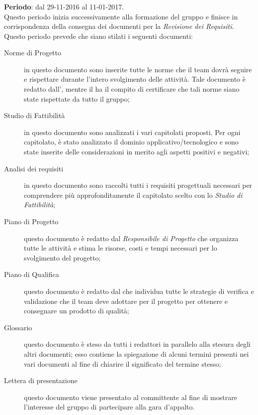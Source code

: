 	\subsubsection{\AR} \label{sec:AR}
	\textbf{Periodo}: dal 29-11-2016 al 11-01-2017.
	\\ Questo periodo inizia successivamente alla formazione del gruppo e finisce in corrispondenza della consegna dei documenti per la \emph{Revisione dei Requisiti}.
	Questo periodo prevede che siano stilati i seguenti documenti:
	\begin{description}
		\item[Norme di Progetto] in questo documento sono inserite tutte le norme che il team dovrà seguire e rispettare durante l'intero svolgimento delle attività. Tale documento è redatto dall'\AMx{}, mentre il \Vx{} ha il compito di certificare che tali norme siano state rispettate da tutto il gruppo;
		\item[Studio di Fattibilità] in questo documento sono analizzati i vari capitolati proposti. Per ogni capitolato, è stato analizzato il dominio applicativo/tecnologico e sono state inserite delle considerazioni in merito agli aspetti positivi e negativi;
		\item[Analisi dei requisiti] in questo documento sono raccolti tutti i requisiti progettuali necessari per comprendere più approfonditamente	il capitolato scelto con lo \emph{Studio di Fattibilità};
		\item[Piano di Progetto] questo documento è redatto dal \emph{Responsibile di Progetto} che organizza tutte le attività e stima le risorse, costi e tempi necessari per lo svolgimento del progetto;
		\item[Piano di Qualifica] questo documento è redatto dal \Vx{} che individua tutte le strategie di verifica e validazione che il team deve adottare per il progetto per ottenere e consegnare un prodotto di qualità;
		\item[Glossario] questo documento è steso da tutti i redattori in parallelo alla stesura degli altri documenti; esso contiene la spiegazione di alcuni termini presenti nei vari documenti al fine di chiarire il significato del termine stesso;
		\item[Lettera di presentazione] questo documento viene presentato al committente al fine di mostrare l'interesse del gruppo di partecipare alla gara d'appalto.
	\end{description}
	
